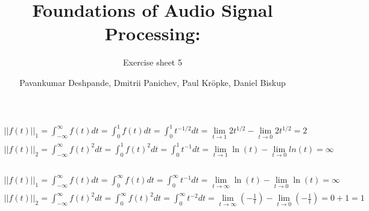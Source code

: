 \documentclass[11pt,a4paper]{scrartcl}
\begin{document}
\author{Pavankumar Deshpande, Dmitrii Panichev, Paul Kröpke, Daniel Biskup}
\title{Foundations of Audio Signal Processing:}
\subtitle{Exercise sheet 5}
\maketitle

\setcounter{section}{5} %
\subsection{} %
\subsubsection{} %
\begin{align}
||f(t)||_1 = \int_{-\infty}^{\infty} f(t) dt = \int_{0}^{1} f(t) dt = \int_{0}^{1} t^{-1/2} dt = \lim_{t \to 1} 2 t^{1/2} - \lim_{t \to 0} 2 t^{1/2} = 2\\
||f(t)||_2 = \int_{-\infty}^{\infty} f(t)^{2} dt = \int_{0}^{1} f(t)^2 dt = \int_{0}^{1} t^{-1} dt = \lim_{t \to 1} \ln(t) - \lim_{t \to 0} ln(t) = \infty
\end{align}

\subsubsection{} %
\begin{align}
||f(t)||_1 = \int_{-\infty}^{\infty} f(t) dt = \int_{0}^{\infty} f(t) dt = \int_{0}^{\infty} t^{-1} dt = \lim_{t \to \infty} \ln(t) - \lim_{t \to 0} \ln(t) = \infty\\
||f(t)||_2 = \int_{-\infty}^{\infty} f(t)^{2} dt = \int_{0}^{\infty} f(t)^2 dt = \int_{0}^{\infty} t^{-2} dt = \lim_{t \to \infty} (-\frac{1}{t}) - \lim_{t \to 0} (-\frac{1}{t}) = 0 + 1 = 1
\end{align}
\end{document}
